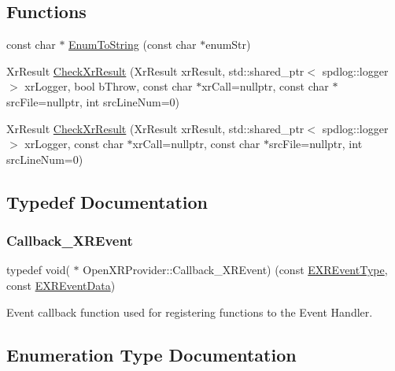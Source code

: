 \subsection*{Functions}
\begin{DoxyCompactItemize}
\item 
const char $\ast$ \mbox{\hyperlink{namespace_open_x_r_provider_a9d83a2b1a5d6649210b47ab49a592b47}{Enum\+To\+String}} (const char $\ast$enum\+Str)
\item 
Xr\+Result \mbox{\hyperlink{namespace_open_x_r_provider_a832e6cc66984ff274e355f5771a04f57}{Check\+Xr\+Result}} (Xr\+Result xr\+Result, std\+::shared\+\_\+ptr$<$ spdlog\+::logger $>$ xr\+Logger, bool b\+Throw, const char $\ast$xr\+Call=nullptr, const char $\ast$src\+File=nullptr, int src\+Line\+Num=0)
\item 
Xr\+Result \mbox{\hyperlink{namespace_open_x_r_provider_a9e6665bb283f00adb11c3c4ee57c05dd}{Check\+Xr\+Result}} (Xr\+Result xr\+Result, std\+::shared\+\_\+ptr$<$ spdlog\+::logger $>$ xr\+Logger, const char $\ast$xr\+Call=nullptr, const char $\ast$src\+File=nullptr, int src\+Line\+Num=0)
\end{DoxyCompactItemize}


\subsection{Typedef Documentation}
\mbox{\label{namespace_open_x_r_provider_a658d364c78f8aa6deb33009e9c4ac0b8}} 
\subsubsection{\texorpdfstring{Callback\_XREvent}{Callback\_XREvent}}
{\footnotesize\ttfamily typedef void( $\ast$ Open\+X\+R\+Provider\+::\+Callback\+\_\+\+X\+R\+Event) (const \mbox{\hyperlink{namespace_open_x_r_provider_aa80d286c249d35071f2ff4d19d9dc4c3}{E\+X\+R\+Event\+Type}}, const \mbox{\hyperlink{namespace_open_x_r_provider_a45de367abcea927b192e21d1c8b9853d}{E\+X\+R\+Event\+Data}})}



Event callback function used for registering functions to the Event Handler. 



\subsection{Enumeration Type Documentation}
\mbox{\label{namespace_open_x_r_provider_a45de367abcea927b192e21d1c8b9853d}} 
